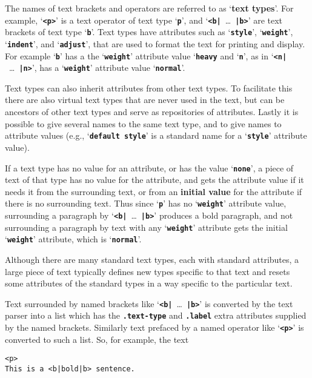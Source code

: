\documentclass[12pt]{article}
\newcommand{\TT}[1]{{\tt \bfseries #1}}
\newcommand{\key}[1]{{\rm \bfseries #1}}
\newcommand{\ttkey}[1]{{\tt \bfseries #1}}
\newcommand{\ttdkey}[1]{{\tt \bfseries .#1}}
\newenvironment{indpar}[1][0.3in]%
	{\begin{list}{}%
		     {\setlength{\itemsep}{0in}%
		      \setlength{\topsep}{0in}%
		      \setlength{\parsep}{1ex}%
		      \setlength{\labelwidth}{#1}%
		      \setlength{\leftmargin}{#1}%
		      \addtolength{\leftmargin}{\labelsep}}%
	 \item}%
	{\end{list}}
\begin{document}
The names of text brackets and operators are
referred to as `\key{text types}'.  For example, `\TT{<p>}' is a text
operator of text type `\TT{p}', and `\TT{<b|}~\ldots~\TT{|b>}'
are text brackets of text type `\TT{b}'.
Text types have attributes
such as `\TT{style}', `\TT{weight}', `\TT{indent}', and `\TT{adjust}',
that are used to format the text for printing and display.
For example `\TT{b}' has a the `\TT{weight}' attribute value
`\TT{heavy} and `\TT{n}', as in
`\TT{<n|}~\ldots~\TT{|n>}',
has a `\TT{weight}' attribute value `\TT{normal}'.

Text types
can also inherit attributes from other text types.  To facilitate this
there are also virtual text types that are never used in the text,
but can be ancestors of other text types and serve as repositories of
attributes.  Lastly it is possible to give several names to the same
text type, and to give names to attribute values (e.g., `\TT{default style}'
is a standard name for a `\TT{style}' attribute value).

If a text type has no value for an attribute, or has the value
`\ttkey{none}', a piece of text of that type
has no value for the attribute, and
gets the attribute value if it needs it from the surrounding text, or from an
\key{initial value}
for the attribute if there is no surrounding text.
Thus since `\TT{p}' has no `\TT{weight}' attribute value, surrounding a
paragraph by `\TT{<b|}~\ldots~\TT{|b>}' produces a bold paragraph,
and not surrounding a paragraph by text with any `\TT{weight}' attribute
gets the initial `\TT{weight}' attribute, which is `\TT{normal}'.

Although there are many
standard text types, each with standard attributes, a large piece of
text typically defines new types specific to that text and resets some
attributes of the standard types in a way specific to the particular
text.

Text surrounded by named brackets like `\TT{<b|}~\ldots~\TT{|b>}'
is converted by the text parser
into a list which has the \ttdkey{text-type} and \ttdkey{label}
extra attributes supplied by the named brackets.
Similarly text prefaced by a named operator like `\TT{<p>}'
is converted to such a list.  So, for example, the text

\begin{indpar}\begin{verbatim}
<p>
This is a <b|bold|b> sentence.
\end{verbatim}\end{indpar}
\end{document}
